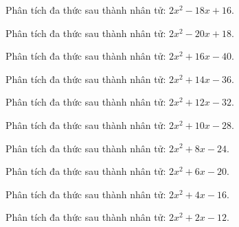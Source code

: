 \begin{bt}
	Phân tích đa thức sau thành nhân tử: $2 x^2 - 18 x + 16$.
\end{bt}
\begin{bt}
	Phân tích đa thức sau thành nhân tử: $2 x^2 - 20 x + 18$.
\end{bt}
\begin{bt}
	Phân tích đa thức sau thành nhân tử: $2 x^2 + 16 x - 40$.
\end{bt}
\begin{bt}
	Phân tích đa thức sau thành nhân tử: $2 x^2 + 14 x - 36$.
\end{bt}
\begin{bt}
	Phân tích đa thức sau thành nhân tử: $2 x^2 + 12 x - 32$.
\end{bt}
\begin{bt}
	Phân tích đa thức sau thành nhân tử: $2 x^2 + 10 x - 28$.
\end{bt}
\begin{bt}
	Phân tích đa thức sau thành nhân tử: $2 x^2 + 8 x - 24$.
\end{bt}
\begin{bt}
	Phân tích đa thức sau thành nhân tử: $2 x^2 + 6 x - 20$.
\end{bt}
\begin{bt}
	Phân tích đa thức sau thành nhân tử: $2 x^2 + 4 x - 16$.
\end{bt}
\begin{bt}
	Phân tích đa thức sau thành nhân tử: $2 x^2 + 2 x - 12$.
\end{bt}
